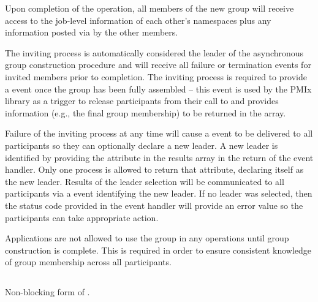 Upon completion of the operation, all members of the new group will receive access to the job-level information of each other’s namespaces plus any information posted via  by the other members.

The inviting process is automatically considered the leader of the asynchronous group construction procedure and will receive all failure or termination events for invited members prior to completion. The inviting process is required to provide a  event once the group has been fully assembled – this event is used by the \ac{PMIx} library as a trigger to release participants from their call to  and provides information (e.g., the final group membership) to be returned in the  array.

Failure of the inviting process at any time will cause a  event to be delivered to all participants so they can optionally declare a new leader. A new leader is identified by providing the  attribute in the results array in the return of the event handler. Only one process is allowed to return that attribute, declaring itself as the new leader. Results of the leader selection will be communicated to all participants via a  event identifying the new leader. If no leader was selected, then the status code provided in the event handler will provide an error value so the participants can take appropriate action.

\adviceuserstart
Applications are not allowed to use the group in any operations until group construction is complete. This is required in order to ensure consistent knowledge of group membership across all participants.
\adviceuserend


\subsection{}

\summary

Non-blocking form of .

\format


